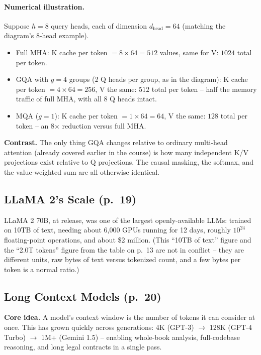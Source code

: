 \documentclass[11pt]{article}
\begin{document}
\paragraph{Numerical illustration.} Suppose $h=8$ query heads, each of dimension $d_{\text{head}}=64$ (matching the diagram's 8-head example).
\begin{itemize}
\item Full MHA: K cache per token $= 8\times64=512$ values, same for V: $1024$ total per token.
\item GQA with $g=4$ groups (2 Q heads per group, as in the diagram): K cache per token $=4\times64=256$, V the same: $512$ total per token -- half the memory traffic of full MHA, with all 8 Q heads intact.
\item MQA ($g=1$): K cache per token $=1\times64=64$, V the same: $128$ total per token -- an 8$\times$ reduction versus full MHA.
\end{itemize}

\textbf{Contrast.} The only thing GQA changes relative to ordinary multi-head attention (already covered earlier in the course) is how many independent K/V projections exist relative to Q projections. The causal masking, the softmax, and the value-weighted sum are all otherwise identical.

\subsection{LLaMA 2's Scale (p.\ 19)}

LLaMA 2 70B, at release, was one of the largest openly-available LLMs: trained on 10TB of text, needing about 6{,}000 GPUs running for 12 days, roughly $10^{24}$ floating-point operations, and about \$2 million. (This ``10TB of text'' figure and the ``2.0T tokens'' figure from the table on p.\ 13 are not in conflict -- they are different units, raw bytes of text versus tokenized count, and a few bytes per token is a normal ratio.)

\subsection{Long Context Models (p.\ 20)}

\textbf{Core idea.} A model's context window is the number of tokens it can consider at once. This has grown quickly across generations: 4K (GPT-3) $\to$ 128K (GPT-4 Turbo) $\to$ 1M+ (Gemini 1.5) -- enabling whole-book analysis, full-codebase reasoning, and long legal contracts in a single pass.
\end{document}
